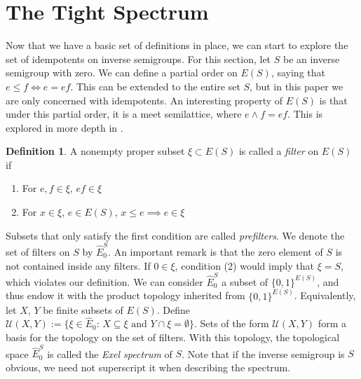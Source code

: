\documentclass[12pt]{article}
\theoremstyle{definition}
\newtheorem{definition}[theorem]{Definition}
\begin{document}

\section{The Tight Spectrum}
Now that we have a basic set of definitions in place, we can start to explore
the set of idempotents on inverse semigroups. For this section, let $S$ be an
inverse semigroup with zero. We can define a partial order on $E(S)$, saying that $e \leq f \iff e = ef$.
This can be extended to the entire set $S$, but in this paper we are only concerned with idempotents.
An interesting property of $E(S)$ is that under this partial order, it is a meet semilattice, where
$e \land f = ef$. This is explored in more depth in \parencite{lawson}.

\begin{definition}
    A nonempty proper subset $\xi \subset E(S)$ is called a \emph{filter} on $E(S)$ if
    \begin{enumerate}
        \item For $e, f \in \xi$, $ef \in \xi$
        \item For $x \in \xi$, $e \in E(S)$, $x \leq e \implies e \in \xi$
    \end{enumerate}
\end{definition}
Subsets that only satisfy the first condition are called \emph{prefilters}.
We denote the set of filters on $S$ by $\hat{E}_0^S$. 
An important remark is that the zero element of $S$ is not contained 
inside any filters. If $0 \in \xi$, condition (2) would imply that $\xi = S$,
which violates our definition. We can consider $\hat{E}_0^S$ a subset of $\{0, 1\}^{E(S)}$,
and thus endow it with the product topology inherited from $\{0, 1\}^{E(S)}$. Equivalently,
let $X$, $Y$ be finite subsets of $E(S)$. Define $\mathcal{U}(X, Y) := \{\xi \in \hat{E}_0\text{: } X \subseteq \xi \text{ and } Y \cap \xi = \emptyset\}$.
Sets of the form $\mathcal{U}(X, Y)$ form a basis for the topology on the set of filters. With this topology, the topological
space $\hat{E}_0^S$ is called the \emph{Exel spectrum} of $S$. Note that if the inverse semigroup is $S$ obvious, we need not superscript it when describing the spectrum.
\end{document}
